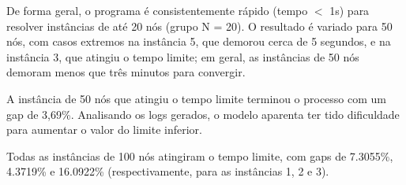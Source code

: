 \documentclass{article}
\begin{document}
De forma geral, o programa é consistentemente rápido (tempo $<$ 1s) para resolver instâncias de até 20 nós (grupo N = 20). O resultado é variado para 50 nós, com casos extremos na instância 5, que demorou cerca de 5 segundos, e na instância 3, que atingiu o tempo limite; em geral, as instâncias de 50 nós demoram menos que três minutos para convergir.

A instância de 50 nós que atingiu o tempo limite terminou o processo com um gap de 3,69\%. Analisando os logs gerados, o modelo aparenta ter tido dificuldade para aumentar o valor do limite inferior.

Todas as instâncias de 100 nós atingiram o tempo limite, com gaps de 7.3055\%, 4.3719\% e 16.0922\% (respectivamente, para as instâncias 1, 2 e 3).

\newpage


\end{document}
